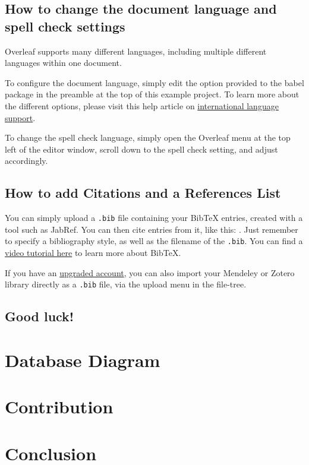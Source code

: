 \documentclass[12pt,a4paper]{article}
\begin{document}
\subsection{How to change the document language and spell check settings}

Overleaf supports many different languages, including multiple different languages within one document. 

To configure the document language, simply edit the option provided to the babel package in the preamble at the top of this example project. To learn more about the different options, please visit this help article on \href{https://www.overleaf.com/learn/latex/International_language_support}{international language support}.

To change the spell check language, simply open the Overleaf menu at the top left of the editor window, scroll down to the spell check setting, and adjust accordingly.

\subsection{How to add Citations and a References List}

You can simply upload a \verb|.bib| file containing your BibTeX entries, created with a tool such as JabRef. You can then cite entries from it, like this: \cite{greenwade93}. Just remember to specify a bibliography style, as well as the filename of the \verb|.bib|. You can find a \href{https://www.overleaf.com/help/97-how-to-include-a-bibliography-using-bibtex}{video tutorial here} to learn more about BibTeX.

If you have an \href{https://www.overleaf.com/user/subscription/plans}{upgraded account}, you can also import your Mendeley or Zotero library directly as a \verb|.bib| file, via the upload menu in the file-tree.

\subsection{Good luck!}
\section{Database Diagram}
\section{Contribution}
\section{Conclusion}
\end{document}
